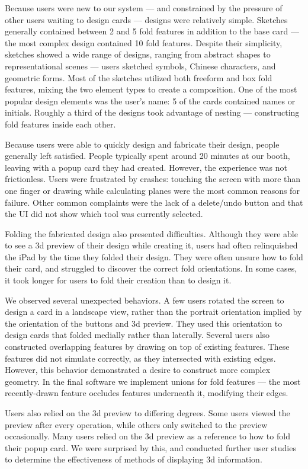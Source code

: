 Because users were new to our system --- and constrained by the pressure
of other users waiting to design cards --- designs were relatively
simple. Sketches generally contained between 2 and 5 fold features in
addition to the base card --- the most complex design contained 10 fold
features. Despite their simplicity, sketches showed a wide range of
designs, ranging from abstract shapes to representational scenes ---
users sketched symbols, Chinese characters, and geometric forms. Most of
the sketches utilized both freeform and box fold features, mixing the
two element types to create a composition. One of the most popular
design elements was the user's name: 5 of the cards contained names or
initials. Roughly a third of the designs took advantage of nesting ---
constructing fold features inside each other.

Because users were able to quickly design and fabricate their design,
people generally left satisfied. People typically spent around 20
minutes at our booth, leaving with a popup card they had created.
However, the experience was not frictionless. Users were frustrated by
crashes: touching the screen with more than one finger or drawing while
calculating planes were the most common reasons for failure. Other
common complaints were the lack of a delete/undo button and that the UI
did not show which tool was currently selected.

Folding the fabricated design also presented difficulties. Although they
were able to see a 3d preview of their design while creating it, users
had often relinquished the iPad by the time they folded their design.
They were often unsure how to fold their card, and struggled to discover
the correct fold orientations. In some cases, it took longer for users
to fold their creation than to design it.

We observed several unexpected behaviors. A few users rotated the screen
to design a card in a landscape view, rather than the portrait
orientation implied by the orientation of the buttons and 3d preview.
They used this orientation to design cards that folded medially rather
than laterally. Several users also constructed overlapping features by
drawing on top of existing features. These features did not simulate
correctly, as they intersected with existing edges. However, this
behavior demonstrated a desire to construct more complex geometry. In
the final software we implement unions for fold features --- the most
recently-drawn feature occludes features underneath it, modifying their
edges.

Users also relied on the 3d preview to differing degrees. Some users
viewed the preview after every operation, while others only switched to
the preview occasionally. Many users relied on the 3d preview as a
reference to how to fold their popup card. We were surprised by this,
and conducted further user studies to determine the effectiveness of
methods of displaying 3d information.

